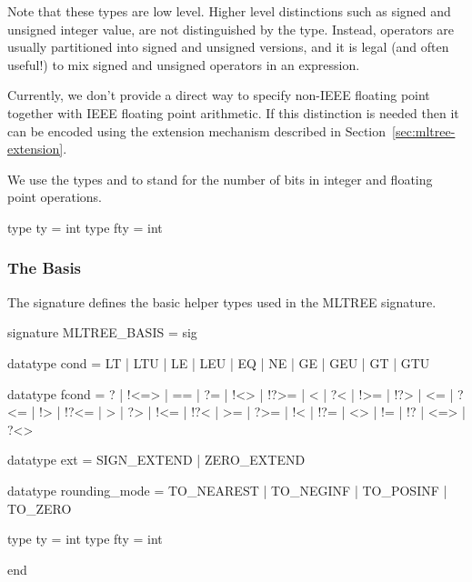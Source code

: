 Note that these types are low level.  Higher level distinctions such
as signed and unsigned integer value, are not distinguished by the type.  
Instead, operators are usually partitioned into signed and unsigned versions, 
and it is legal (and often useful!) to mix signed and unsigned operators in
an expression.

Currently, we don't provide a direct way to specify non-IEEE floating point 
together with
IEEE floating point arithmetic.  If this distinction is needed then
it can be encoded using the extension mechanism described
in Section~\ref{sec:mltree-extension}.

We use the types  and  to stand for the number of
bits in integer and floating point operations.  
\begin{SML}
  type ty  = int
  type fty = int
\end{SML}

\subsubsection{The Basis}
The signature 
defines the basic helper types used in the MLTREE signature.  
\begin{SML}
signature MLTREE_BASIS =
sig
 
  datatype cond = LT | LTU | LE | LEU | EQ | NE | GE | GEU | GT | GTU 

  datatype fcond = 
     ? | !<=> | == | ?= | !<> | !?>= | < | ?< | !>= | !?> |
     <= | ?<= | !> | !?<= | > | ?> | !<= | !?< | >= | ?>= |
     !< | !?= | <> | != | !? | <=> | ?<>

  datatype ext = SIGN_EXTEND | ZERO_EXTEND

  datatype rounding_mode = TO_NEAREST | TO_NEGINF | TO_POSINF | TO_ZERO

  type ty = int
  type fty = int

end
\end{SML}


